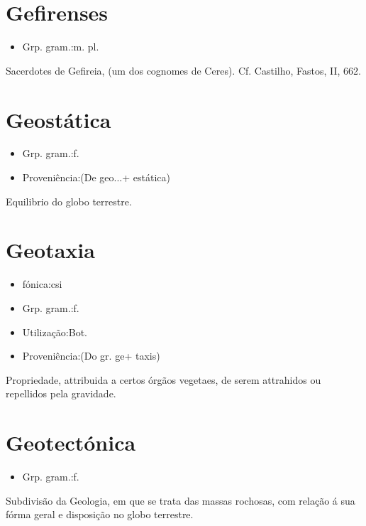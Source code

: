 \section{Gefirenses}
\begin{itemize}
\item {Grp. gram.:m. pl.}
\end{itemize}
Sacerdotes de Gefireia, (um dos cognomes de Ceres). Cf. Castilho, \textunderscore Fastos\textunderscore , II, 662.
\section{Geostática}
\begin{itemize}
\item {Grp. gram.:f.}
\end{itemize}
\begin{itemize}
\item {Proveniência:(De \textunderscore geo...\textunderscore  + \textunderscore estática\textunderscore )}
\end{itemize}
Equilibrio do globo terrestre.
\section{Geotaxia}
\begin{itemize}
\item {fónica:csi}
\end{itemize}
\begin{itemize}
\item {Grp. gram.:f.}
\end{itemize}
\begin{itemize}
\item {Utilização:Bot.}
\end{itemize}
\begin{itemize}
\item {Proveniência:(Do gr. \textunderscore ge\textunderscore  + \textunderscore taxis\textunderscore )}
\end{itemize}
Propriedade, attribuida a certos órgãos vegetaes, de serem attrahidos ou repellidos pela gravidade.
\section{Geotectónica}
\begin{itemize}
\item {Grp. gram.:f.}
\end{itemize}
Subdivisão da Geologia, em que se trata das massas rochosas, com relação á sua fórma geral e disposição no globo terrestre.
